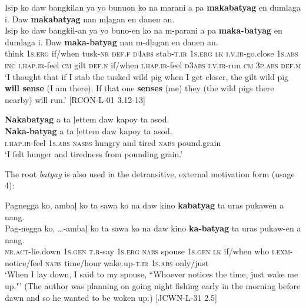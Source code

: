 \ea 
\label{ex:willrun}
Isip  ko  daw  bangkilan  ya  yo  bunuon  ko  na  marani a  pa  \textbf{makabatyag}  en  dumlaga  i.  Daw  \textbf{makabatyag} nan  mļagan  en  danen  an. \\\smallskip
\gll Isip  ko  daw  bangkil-an  ya  yo  buno-en  ko  na  m-parani a  pa  \textbf{maka-batyag}  en  dumlaga  i.  Daw  \textbf{maka-batyag} nan  m-dļagan  en  danen  an. \\
think  1\textsc{s.erg}  if/when  tusk-\textsc{nr}  \textsc{def.f}  \textsc{d}4\textsc{abs}  stab-\textsc{t.ir}  1\textsc{s.erg}  \textsc{lk}  \textsc{i.v.ir}-go.close
1\textsc{s.abs}  \textsc{inc}  \textsc{i.hap.ir}-feel  \textsc{cm}  gilt  \textsc{def.n}  if/when  \textsc{i.hap.ir}-feel
\textsc{d}3\textsc{abs}  \textsc{i.v.ir}-run  \textsc{cm}  3\textsc{p.abs}  \textsc{def.m} \\
\glt ‘I thought that if I stab the tusked wild pig when I get closer, the gilt wild pig \textbf{will sense} (I am there). If that one \textbf{senses} (me) they (the wild pigs there nearby) will run.’ [RCON-L-01 3.12-13]
\z  


\ea 
\label{ex:poundinggrain}
\textbf{Nakabatyag}  a  ta  ļettem  daw  kapoy  ta  asod. \\\smallskip
\gll \textbf{Naka-batyag}  a  ta  ļettem  daw  kapoy  ta  asod. \\
\textsc{i.hap.ir}-feel  1\textsc{s.abs}  \textsc{nasbs}  hungry  and  tired  \textsc{nabs}  pound.grain \\
\glt ‘I felt hunger and tiredness from pounding grain.’
\z  

The root \textit{batyag} is also used in the detransitive, external motivation form (usage 4):

\ea
Pagnegga ko, ambaļ ko ta sawa ko na daw kino \textbf{kabatyag} ta uras pukawen a nang. \\\smallskip
\gll Pag-negga ko,  …-ambaļ ko ta sawa ko na daw kino \textbf{ka-batyag} ta uras pukaw-en a nang. \\
\textsc{nr.act}-lie.down 1\textsc{s.gen} \textsc{t.r}-say 1\textsc{s.erg} \textsc{nabs} spouse 1\textsc{s.gen} \textsc{lk} if/when who \textsc{i.exm}-notice/feel \textsc{nabs} time/hour wake.up-\textsc{t.ir} 1\textsc{s.abs} only/just \\
\glt `When I lay down, I said to my spouse, ``Whoever notices the time, just wake me up."’  (The author was planning on going night fishing early in the morning before dawn and so he wanted to be woken up.) [JCWN-L-31 2.5]
\z

